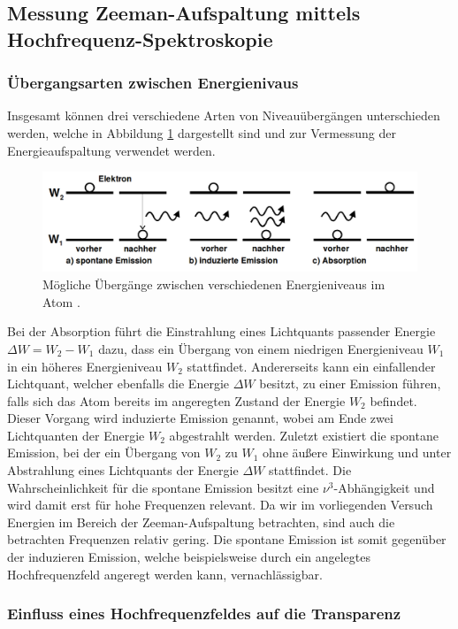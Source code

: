\subsection{Messung Zeeman-Aufspaltung mittels Hochfrequenz-Spektroskopie}


\subsubsection{Übergangsarten zwischen Energienivaus}
Insgesamt können drei verschiedene Arten von Niveauübergängen unterschieden werden, welche in Abbildung \ref{fig:theorie3} dargestellt sind und zur Vermessung der Energieaufspaltung verwendet werden.

\begin{figure}
  \centering
  \includegraphics[height=3cm]{ressources/theorie3.png}
  \caption{Mögliche Übergänge zwischen verschiedenen Energieniveaus im Atom \cite{skript}.}
  \label{fig:theorie3}
\end{figure}

Bei der Absorption führt die Einstrahlung eines Lichtquants passender Energie $\Delta W = W_2 - W_1$ dazu, dass ein Übergang von einem niedrigen Energieniveau $W_1$ in ein höheres Energieniveau $W_2$ stattfindet.
Andererseits kann ein einfallender Lichtquant, welcher ebenfalls die Energie $\Delta W$ besitzt, zu einer Emission führen, falls sich das Atom bereits im angeregten Zustand der Energie $W_2$ befindet.
Dieser Vorgang wird induzierte Emission genannt, wobei am Ende zwei Lichtquanten der Energie $W_2$ abgestrahlt werden.
Zuletzt existiert die spontane Emission, bei der ein Übergang von $W_2$ zu $W_1$ ohne äußere Einwirkung und unter Abstrahlung eines Lichtquants der Energie $\Delta W$ stattfindet.
Die Wahrscheinlichkeit für die spontane Emission besitzt eine $\nu^3$-Abhängigkeit und wird damit erst für hohe Frequenzen relevant.
Da wir im vorliegenden Versuch Energien im Bereich der Zeeman-Aufspaltung betrachten, sind auch die betrachten Frequenzen relativ gering.
Die spontane Emission ist somit gegenüber der induzieren Emission, welche beispielsweise durch ein angelegtes Hochfrequenzfeld angeregt werden kann, vernachlässigbar.

\subsubsection{Einfluss eines Hochfrequenzfeldes auf die Transparenz}

